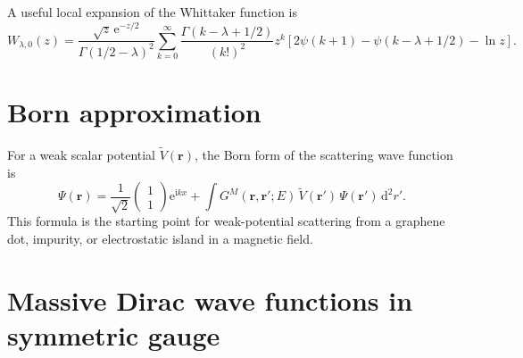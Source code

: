 \documentclass[11pt]{article}
\newcommand{\dd}{\,\mathrm d}
\newcommand{\ii}{\mathrm i}
\newcommand{\ee}{\mathrm e}
\begin{document}
A useful local expansion of the Whittaker function is
\begin{equation}
  W_{\lambda,0}(z)=\frac{\sqrt z\,\ee^{-z/2}}{\Gamma(1/2-\lambda)^2}
  \sum_{k=0}^{\infty}\frac{\Gamma(k-\lambda+1/2)}{(k!)^2}z^k
  \left[2\psi(k+1)-\psi(k-\lambda+1/2)-\ln z\right].
\end{equation}

\section{Born approximation}

For a weak scalar potential \(\widetilde V(\bm r)\), the Born form of the scattering wave function is
\begin{equation}
  \Psi(\bm r)=\frac{1}{\sqrt2}
  \begin{pmatrix}1\\1\end{pmatrix}\ee^{\ii kx}
  +\int G^M(\bm r,\bm r';E)\,\widetilde V(\bm r')\,\Psi(\bm r')\dd^2r'.
\end{equation}
This formula is the starting point for weak-potential scattering from a graphene dot, impurity, or electrostatic island in a magnetic field.

\section{Massive Dirac wave functions in symmetric gauge}
\end{document}

